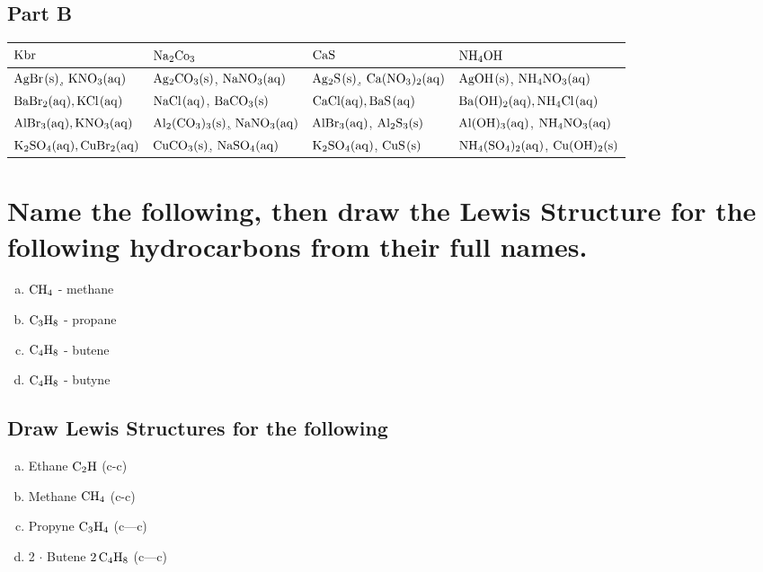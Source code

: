\documentclass{scrartcl}
\begin{document}
\subsection{Part B}
\label{sec:org0a0bf3c}
\begin{center}
\begin{tabular}{llll}
\toprule
\(\ce{Kbr}\) & \(\ce{Na2Co3}\) & \(\ce{CaS}\) & \(\ce{NH4OH}\)\\
\midrule
\uline{\(\ce{AgBr(s)}\),} \(\ce{KNO3(aq)}\) & \uline{\(\ce{Ag2CO3(s)}\)}, \(\ce{NaNO3(aq)}\) & \uline{\(\ce{Ag2S(s)}\),}  \(\ce{Ca(NO3)2(aq)}\) & \uline{\(\ce{AgOH(s)}\)}, \(\ce{NH4NO3(aq)}\)\\
\midrule
\(\ce{BaBr2(aq), KCl(aq)}\) & \(\ce{NaCl(aq)}\), \uline{\(\ce{BaCO3(s)}\)} & \(\ce{CaCl(aq), BaS(aq)}\) & \(\ce{Ba(OH)2(aq), NH4Cl(aq)}\)\\
\midrule
\(\ce{AlBr3(aq), KNO3(aq)}\) & \uline{\(\ce{Al2(CO3)3(s)}\),} \(\ce{NaNO3(aq)}\) & \(\ce{AlBr3(aq)}\), \uline{\(\ce{Al2S3(s)}\)} & \uline{\(\ce{Al(OH)3(aq)}\),} \(\ce{NH4NO3(aq)}\)\\
\midrule
\(\ce{K2SO4(aq), CuBr2(aq)}\) & \uline{\(\ce{CuCO3(s)}\),} \(\ce{NaSO4(aq)}\) & \(\ce{K2SO4(aq)}\), \uline{\(\ce{CuS(s)}\)} & \(\ce{NH4(SO4)2(aq)}\), \uline{\(\ce{Cu(OH)2(s)}\)}\\
\bottomrule
\end{tabular}
\end{center}

\section{Name the following, then draw the Lewis Structure for the following hydrocarbons from their full names.}
\label{sec:org1c30491}
\begin{enumerate}[a.]
\item \(\ce{CH4}\) - methane
\item \(\ce{C3H8}\) - propane
\item \(\ce{C4H8}\) - butene
\item \(\ce{C4H8}\) - butyne
\end{enumerate}

\subsection{Draw Lewis Structures for the following}
\label{sec:org4dddd47}
\begin{enumerate}[a.]
\item Ethane \(\ce{C2H}\) (c-c)
\item Methane \(\ce{CH4}\) (c-c)
\item Propyne \(\ce{C3H4}\) (c---c)
\item 2 \(\cdot\) Butene \(\ce{2C4H8}\) (c---c)
\end{enumerate}
\end{document}
